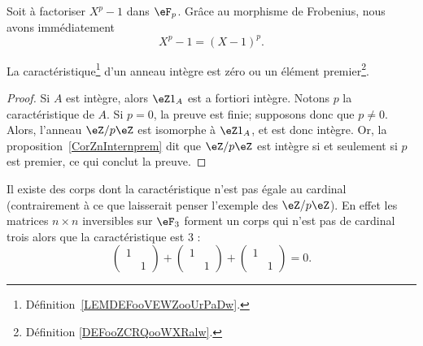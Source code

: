 \begin{example}
    Soit à factoriser \( X^p-1\) dans \( \eF_p\). Grâce au morphisme de Frobenius, nous avons immédiatement
    \begin{equation}
        X^p-1=(X-1)^p.
    \end{equation}
\end{example}


\begin{lemma}       \label{LemCaractIntergernbrcartpre}
    La caractéristique\footnote{Définition~\ref{LEMDEFooVEWZooUrPaDw}.} d'un anneau intègre est zéro ou un élément premier\footnote{Définition \ref{DEFooZCRQooWXRalw}.}.
\end{lemma}

\begin{proof}
    Si \( A\) est intègre, alors \( \eZ 1_A\) est a fortiori intègre. Notons \( p \) la caractéristique de \( A \). Si \( p = 0 \), la preuve est finie; supposons donc que \( p \neq 0 \). Alors, l'anneau \( \eZ/p\eZ\) est isomorphe à \( \eZ 1_A\), et est donc intègre. Or, la proposition~\ref{CorZnInternprem} dit que \( \eZ/p\eZ\) est intègre si et seulement si \( p\) est premier, ce qui conclut la preuve.
\end{proof}

\begin{example}
    Il existe des corps dont la caractéristique n'est pas égale au cardinal (contrairement à ce que laisserait penser l'exemple des \( \eZ/p\eZ\)). En effet les matrices \( n\times n\) inversibles sur \( \eF_{3}\) forment un corps qui n'est pas de cardinal trois alors que la caractéristique est \( 3\) :
    \begin{equation}
        \begin{pmatrix}
            1    &       \\
                &   1
            \end{pmatrix}+\begin{pmatrix}
                1    &       \\
                    &   1
                \end{pmatrix}+\begin{pmatrix}
                    1    &       \\
                        &   1
                \end{pmatrix}=0.
    \end{equation}
\end{example}


